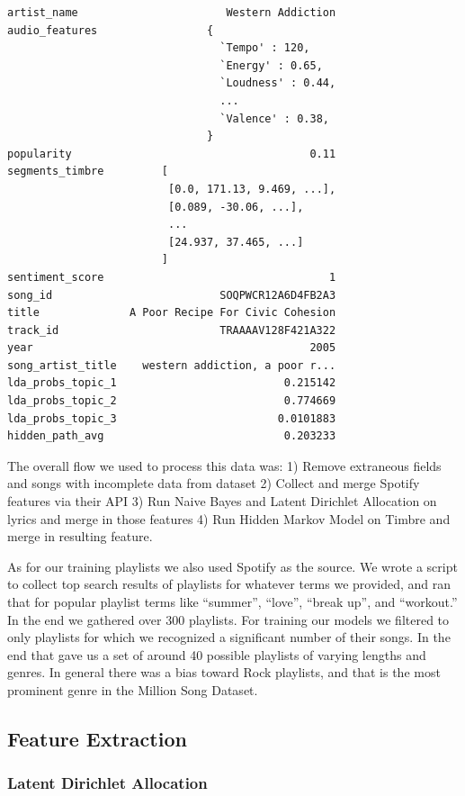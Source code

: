 \documentclass[acmtog]{acmart}
\begin{document}
\begin{verbatim}
artist_name                       Western Addiction
audio_features                 {
                                 `Tempo' : 120,
                                 `Energy' : 0.65,
                                 `Loudness' : 0.44,
                                 ...
                                 `Valence' : 0.38,
                               }
popularity                                     0.11
segments_timbre         [
                         [0.0, 171.13, 9.469, ...],
                         [0.089, -30.06, ...],
                         ...
                         [24.937, 37.465, ...]
                        ]
sentiment_score                                   1
song_id                          SOQPWCR12A6D4FB2A3
title              A Poor Recipe For Civic Cohesion
track_id                         TRAAAAV128F421A322
year                                           2005
song_artist_title    western addiction, a poor r...
lda_probs_topic_1                          0.215142
lda_probs_topic_2                          0.774669
lda_probs_topic_3                         0.0101883
hidden_path_avg                            0.203233
\end{verbatim}
The overall flow we used to process this data was: 1) Remove extraneous fields and songs with incomplete data from dataset 2) Collect and merge Spotify features via their API 3) Run Naive Bayes and Latent Dirichlet Allocation on lyrics and merge in those features 4) Run Hidden Markov Model on Timbre and merge in resulting feature.

As for our training playlists we also used Spotify as the source. We wrote a script to collect top search results of playlists for whatever terms we provided, and ran that for popular playlist terms like ``summer'', ``love'', ``break up'', and ``workout.'' In the end we gathered over 300 playlists. For training our models we filtered to only playlists for which we recognized a significant number of their songs. In the end that gave us a set of around 40 possible playlists of varying lengths and genres. In general there was a bias toward Rock playlists, and that is the most prominent genre in the Million Song Dataset.

\subsection{Feature Extraction}
\subsubsection{Latent Dirichlet Allocation}
\end{document}
